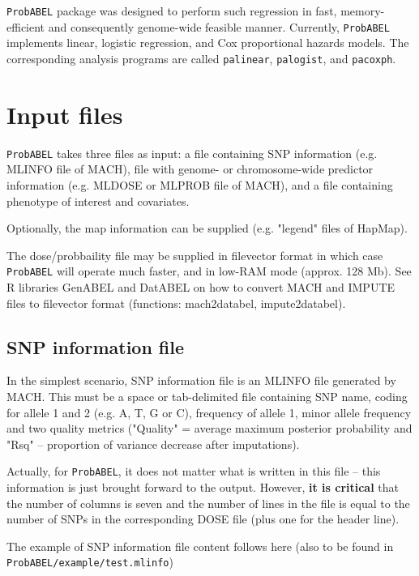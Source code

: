 \documentclass[12pt]{article}
\begin{document}
\texttt{ProbABEL} package was designed to perform such regression in fast, 
memory-efficient and consequently genome-wide feasible manner. 
Currently, \texttt{ProbABEL} implements linear, logistic regression, 
and Cox proportional hazards models. The corresponding analysis 
programs are called \texttt{palinear},  \texttt{palogist},  
and \texttt{pacoxph}.


\section{Input files}
\texttt{ProbABEL} takes three files as input: a file containing SNP 
information (e.g. MLINFO file of MACH), file with genome- or 
chromosome-wide predictor information (e.g. MLDOSE or MLPROB file of MACH), 
and a file containing phenotype of interest and covariates. 

Optionally, the map information can be supplied (e.g. "legend" 
files of HapMap). 

The dose/probbaility file may be supplied in filevector format 
in which case \texttt{ProbABEL} will operate much faster, and 
in low-RAM mode (approx. 128 Mb). See R libraries GenABEL and 
DatABEL on how to convert MACH and IMPUTE files to 
filevector format (functions: mach2databel, impute2databel).

\subsection{SNP information file}
\label{ssec:infoin}
In the simplest scenario, SNP information file is an MLINFO 
file generated by MACH. This must be a space or tab-delimited file 
containing SNP name, coding for allele 1 and 2 (e.g. A, T, G or C), 
frequency of allele 1, minor allele frequency and two quality 
metrics ("Quality" = average maximum posterior probability and 
"Rsq" -- proportion of variance decrease after imputations). 

Actually, 
for \texttt{ProbABEL}, it does not matter what is written in this file -- 
this information is just brought forward to the output. However, 
\textbf{it is critical} that the number of columns is seven and the number 
of lines in the file is equal to the number of SNPs in the 
corresponding DOSE file (plus one for the header line). 

The example of SNP information file content follows here (also 
to be found in \texttt{ProbABEL/example/test.mlinfo})


\end{document}
